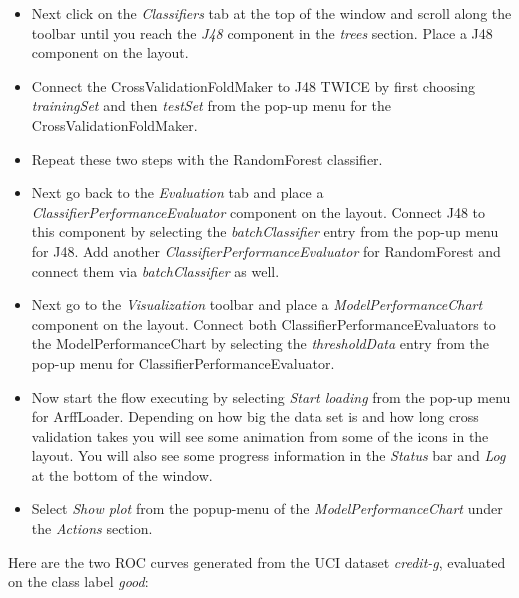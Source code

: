 \begin{itemize}
	\item Next click on the \textit{Classifiers} tab at the top of the window and
	scroll along the toolbar until you reach the \textit{J48} component in the
	\textit{trees} section. Place a J48 component on the layout.

	\item Connect the CrossValidationFoldMaker to J48 TWICE by first choosing
	\textit{trainingSet} and then \textit{testSet} from the pop-up menu for the
	CrossValidationFoldMaker.

	\item Repeat these two steps with the RandomForest classifier.

	\item Next go back to the \textit{Evaluation} tab and place a
	\textit{ClassifierPerformanceEvaluator} component on the layout. Connect J48
	to this component by selecting the \textit{batchClassifier} entry from the
	pop-up menu for J48. Add another \textit{ClassifierPerformanceEvaluator} for
	RandomForest and connect them via \textit{batchClassifier} as well.

	\item Next go to the \textit{Visualization} toolbar and place a 
	\textit{ModelPerformanceChart} component on the layout. Connect both 
	ClassifierPerformanceEvaluators to the ModelPerformanceChart by selecting 
	the \textit{thresholdData} entry from the pop-up menu for ClassifierPerformanceEvaluator.

	\item Now start the flow executing by selecting \textit{Start loading} from the
	pop-up menu for ArffLoader. Depending on how big the data set is and
	how long cross validation takes you will see some animation from some
	of the icons in the layout. You will also see some progress information in the 
	\textit{Status} bar and \textit{Log} at the bottom of the window.
	
	\item Select \textit{Show plot} from the popup-menu of the 
	\textit{ModelPerformanceChart} under the \textit{Actions} section.
\end{itemize}

Here are the two ROC curves generated from the UCI dataset \textit{credit-g}, 
evaluated on the class label \textit{good}:

\begin{center}
\end{center}

